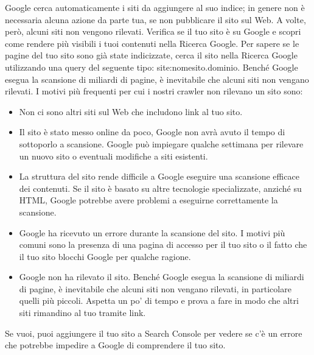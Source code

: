 \documentclass[a4paper]{extarticle}
\begin{document}
Google cerca automaticamente i siti da aggiungere al suo indice; in genere non è necessaria alcuna azione da parte tua, se non pubblicare il sito sul Web. A volte, però, alcuni siti non vengono rilevati. Verifica se il tuo sito è su Google e scopri come rendere più visibili i tuoi contenuti nella Ricerca Google. Per sapere se le pagine del tuo sito sono già state indicizzate, cerca il sito nella Ricerca Google utilizzando una query del seguente tipo: site:nomesito.dominio. Benché Google esegua la scansione di miliardi di pagine, è inevitabile che alcuni siti non vengano rilevati. I motivi più frequenti per cui i nostri crawler non rilevano un sito sono:
\begin{itemize}
\item Non ci sono altri siti sul Web che includono link al tuo sito.
\item Il sito è stato messo online da poco, Google non avrà avuto il tempo di sottoporlo a scansione. Google può impiegare qualche settimana per rilevare un nuovo sito o eventuali modifiche a siti esistenti.
\item La struttura del sito rende difficile a Google eseguire una scansione efficace dei contenuti. Se il sito è basato su altre tecnologie specializzate, anziché su HTML, Google potrebbe avere problemi a eseguirne correttamente la scansione. 
\item Google ha ricevuto un errore durante la scansione del sito. I motivi più comuni sono la presenza di una pagina di accesso per il tuo sito o il fatto che il tuo sito blocchi Google per qualche ragione. 
\item Google non ha rilevato il sito. Benché Google esegua la scansione di miliardi di pagine, è inevitabile che alcuni siti non vengano rilevati, in particolare quelli più piccoli. Aspetta un po' di tempo e prova a fare in modo che altri siti rimandino al tuo tramite link.
\end{itemize}
Se vuoi, puoi aggiungere il tuo sito a Search Console per vedere se c'è un errore che potrebbe impedire a Google di comprendere il tuo sito.
\end{document}
